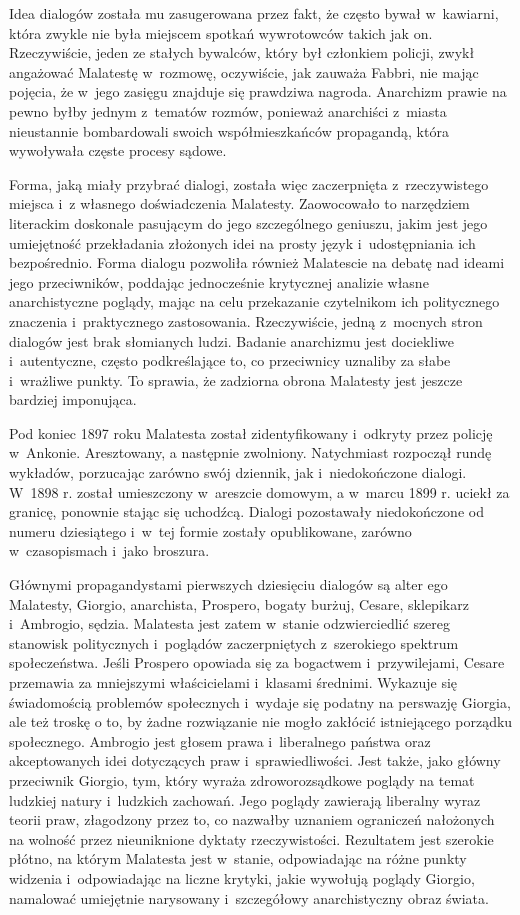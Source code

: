 \documentclass[oneside,polish,11pt,sfheadings]{mwbk}
\begin{document}
 
Idea dialogów została mu zasugerowana przez fakt, że często bywał w~kawiarni, która zwykle nie była miejscem spotkań
wywrotowców takich jak on. Rzeczywiście, jeden ze stałych bywalców, który był członkiem policji, zwykł angażować
Malatestę w~rozmowę, oczywiście, jak zauważa Fabbri, nie mając pojęcia, że w~jego zasięgu znajduje się
prawdziwa nagroda. Anarchizm prawie na pewno byłby jednym z~tematów rozmów, ponieważ anarchiści z~miasta nieustannie
bombardowali swoich współmieszkańców propagandą, która wywoływała częste procesy sądowe. 

 
Forma, jaką miały przybrać dialogi, została więc zaczerpnięta z~rzeczywistego miejsca i~z własnego doświadczenia
Malatesty. Zaowocowało to narzędziem literackim doskonale pasującym do jego szczególnego geniuszu, jakim jest jego
umiejętność przekładania złożonych idei na prosty język i~udostępniania ich bezpośrednio. Forma dialogu pozwoliła
również Malatescie na debatę nad ideami jego przeciwników, poddając jednocześnie krytycznej analizie własne
anarchistyczne poglądy, mając  na celu przekazanie czytelnikom ich politycznego znaczenia i~praktycznego zastosowania.
Rzeczywiście, jedną z~mocnych stron dialogów jest brak słomianych ludzi. Badanie anarchizmu jest dociekliwe i~autentyczne, często podkreślające to, co przeciwnicy uznaliby za słabe i~wrażliwe punkty. To sprawia, że
 zadziorna obrona Malatesty jest jeszcze bardziej imponująca. 

 
Pod koniec 1897 roku Malatesta został zidentyfikowany i~odkryty przez policję w~Ankonie. Aresztowany, a następnie
zwolniony. Natychmiast rozpoczął rundę wykładów, porzucając zarówno swój dziennik, jak i~niedokończone dialogi. W~1898
r. został umieszczony w~areszcie domowym, a w~marcu 1899 r. uciekł za granicę, ponownie stając się uchodźcą. Dialogi
pozostawały niedokończone od numeru dziesiątego i~w~tej formie zostały opublikowane, zarówno w~czasopismach i~jako
broszura. 

 
Głównymi propagandystami pierwszych dziesięciu dialogów są alter ego Malatesty, Giorgio, anarchista, Prospero, bogaty
burżuj, Cesare, sklepikarz i~Ambrogio, sędzia. Malatesta jest zatem w~stanie odzwierciedlić szereg stanowisk
politycznych i~poglądów zaczerpniętych z~szerokiego spektrum społeczeństwa. Jeśli Prospero opowiada się za bogactwem i~przywilejami, Cesare przemawia za mniejszymi właścicielami i~klasami średnimi. Wykazuje się świadomością problemów
społecznych i~wydaje się podatny na perswazję Giorgia, ale też troskę o to, by żadne rozwiązanie nie mogło zakłócić
istniejącego porządku społecznego. Ambrogio jest głosem prawa i~liberalnego państwa oraz akceptowanych idei dotyczących
praw i~sprawiedliwości. Jest także, jako główny przeciwnik Giorgio, tym, który wyraża zdroworozsądkowe poglądy na temat
ludzkiej natury i~ludzkich zachowań. Jego poglądy zawierają liberalny wyraz teorii praw, złagodzony przez to, co
nazwałby uznaniem ograniczeń nałożonych na wolność przez nieuniknione dyktaty rzeczywistości. Rezultatem jest szerokie
płótno, na którym Malatesta jest w~stanie, odpowiadając na różne punkty widzenia i~odpowiadając na liczne krytyki,
jakie wywołują poglądy Giorgio, namalować umiejętnie narysowany i~szczegółowy anarchistyczny obraz świata. 
\end{document}
